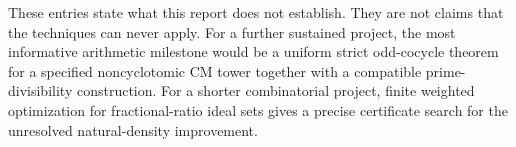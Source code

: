 These entries state what this report does not establish. They are not
claims that the techniques can never apply. For a further sustained
project, the most informative arithmetic milestone would be a
uniform strict odd-cocycle theorem for a specified noncyclotomic CM
tower together with a compatible prime-divisibility construction.
For a shorter combinatorial project, finite weighted optimization
for fractional-ratio ideal sets gives a precise certificate search
for the unresolved natural-density improvement.
